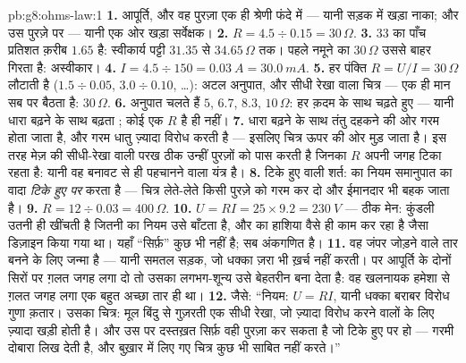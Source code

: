 \begin{solution}{pb:g8:ohms-law:1}
\textbf{1.} आपूर्ति,  और वह पुरज़ा एक ही श्रेणी फंदे में ---
यानी सड़क में खड़ा नाका; और  उस पुरज़े पर --- यानी एक ओर खड़ा
सर्वेक्षक।
\textbf{2.} $R = 4.5 \div 0.15 = 30\,\Omega$.
\textbf{3.} $33$ का पाँच प्रतिशत क़रीब $1.65$ है: स्वीकार्य पट्टी
$31.35$ से $34.65\,\Omega$ तक। पहले नमूने का $30\,\Omega$ उससे बाहर
गिरता है: अस्वीकार।
\textbf{4.} $I = 4.5 \div 150 = \qty{0.03}{A} = \qty{30.0}{mA}$.
\textbf{5.} हर पंक्ति $R = U/I = 30\,\Omega$ लौटाती है ($1.5 \div
0.05$, $3.0 \div 0.10$, \dots): अटल अनुपात, और सीधी रेखा वाला चित्र
--- एक ही मान सब पर बैठता है: $30\,\Omega$.
\textbf{6.} अनुपात चलते हैं $5$, $6.7$, $8.3$, $10\,\Omega$: हर
क़दम के साथ चढ़ते हुए --- यानी धारा बढ़ने के साथ बढ़ता ; कोई
एक $R$ है ही नहीं।
\textbf{7.} धारा बढ़ने के साथ तंतु दहकने की ओर गरम होता जाता है, और
गरम धातु ज़्यादा विरोध करती है --- इसलिए चित्र ऊपर की ओर मुड़ जाता है।
इस तरह मेज़ की सीधी-रेखा वाली परख ठीक उन्हीं पुरज़ों को पास करती है
जिनका $R$ अपनी जगह टिका रहता है: यानी वह बनावट से ही  पहचानने
वाला यंत्र है।
\textbf{8.} टिके हुए  वाली शर्त:  का नियम समानुपात का वादा
\emph{टिके हुए  पर} करता है --- चित्र लेते-लेते किसी पुरज़े को गरम
कर दो और ईमानदार  भी बहक जाता है।
\textbf{9.} $R = 12 \div 0.03 = 400\,\Omega$.
\textbf{10.} $U = R I = 25 \times 9.2 = \qty{230}{V}$ --- ठीक
मेन: कुंडली उतनी ही खींचती है जितनी  का नियम उसे बाँटता है, और
 का हाशिया वैसे ही काम कर रहा है जैसा डिज़ाइन किया गया था।
यहाँ ``सिर्फ़'' कुछ भी नहीं है; सब अंकगणित है।
\textbf{11.} वह जंपर जोड़ने वाले तार बनने के लिए जन्मा है --- यानी
समतल सड़क, जो धक्का ज़रा भी ख़र्च नहीं करती। पर आपूर्ति के दोनों
सिरों पर ग़लत जगह लगा दो तो उसका लगभग-शून्य  उसे बेहतरीन  बना
देता है: वह खलनायक हमेशा से ग़लत जगह लगा एक बहुत अच्छा तार ही था।
\textbf{12.} जैसे: ``नियम: $U = R I$, यानी धक्का बराबर विरोध गुणा
क़तार। उसका चित्र: मूल बिंदु से गुज़रती एक सीधी रेखा, जो ज़्यादा
विरोध करने वालों के लिए ज़्यादा खड़ी होती है। और उस पर दस्तख़त सिर्फ़
वही पुरज़ा कर सकता है जो टिके हुए  पर हो --- गरमी  दोबारा
लिख देती है, और बुख़ार में लिए गए चित्र कुछ भी साबित नहीं करते।''
\end{solution}
